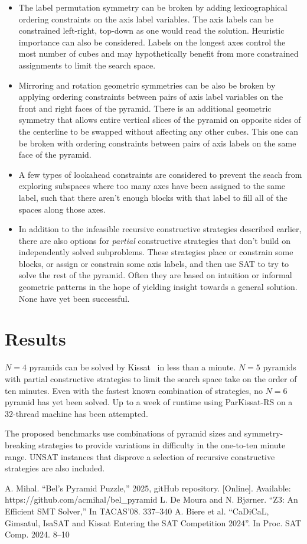 \documentclass[conference]{IEEEtran}
\begin{document}
\begin{itemize}
\item The label permutation symmetry can be broken by adding lexicographical ordering constraints on the axis label variables.
The axis labels can be constrained left-right, top-down as one would read the solution.
Heuristic importance can also be considered.
Labels on the longest axes control the most number of cubes and may hypothetically benefit from more constrained assignments to limit the search space.
\item Mirroring and rotation geometric symmetries can be also be broken by applying ordering constraints between pairs of axis label
variables on the front and right faces of the pyramid.
There is an additional geometric symmetry that allows entire vertical slices of the pyramid on opposite sides of the centerline to be
swapped without affecting any other cubes.
This one can be broken with ordering constraints between pairs of axis labels on the same face of the pyramid.
\item A few types of lookahead constraints are considered to prevent the seach from exploring subspaces where too many axes have been
assigned to the same label, such that there aren't enough blocks with that label to fill all of the spaces along those axes.
\item In addition to the infeasible recursive constructive strategies described earlier, there are also options for \emph{partial} constructive strategies
that don't build on independently solved subproblems.
These strategies place or constrain some blocks, or assign or constrain some axis labels, and then use SAT to try to solve the rest of the pyramid.
Often they are based on intuition or informal geometric patterns in the hope of yielding insight towards a general solution.
None have yet been successful.
\end{itemize}

\section{Results}

$N=4$ pyramids can be solved by Kissat~\cite{k1} in less than a minute.
$N=5$ pyramids with partial constructive strategies to limit the search space take on the order of ten minutes.
Even with the fastest known combination of strategies, no $N=6$ pyramid has yet been solved.
Up to a week of runtime using ParKissat-RS on a 32-thread machine has been attempted.

The proposed benchmarks use combinations of pyramid sizes and symmetry-breaking strategies to provide variations in difficulty in the one-to-ten minute range.
UNSAT instances that disprove a selection of recursive constructive strategies are also included.

\begin{thebibliography}{0}
 A. Mihal. ``Bel's Pyramid Puzzle,'' 2025, gitHub repository. [Online]. Available: https://github.com/acmihal/bel\_pyramid
 L. De Moura and N. Bj{\o}rner. ``Z3: An Efficient SMT Solver,'' In TACAS'08. 337--340
 A. Biere et al. ``CaDiCaL, Gimsatul, IsaSAT and Kissat Entering the SAT Competition 2024''. In Proc. SAT Comp. 2024. 8--10
\end{thebibliography}
\end{document}
